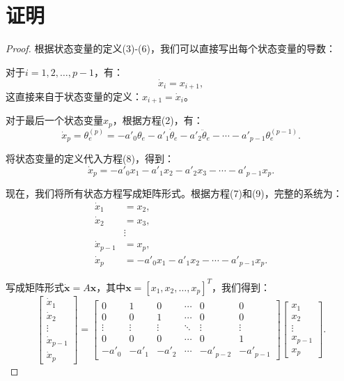 \documentclass[12pt,a4paper]{article}
\newtheorem{proof}{证明}
\begin{document}
\section{证明}

\begin{proof}
根据状态变量的定义(3)-(6)，我们可以直接写出每个状态变量的导数：

对于$i = 1, 2, \ldots, p-1$，有：
\begin{equation}
\dot{x}_i = x_{i+1},
\end{equation}
这直接来自于状态变量的定义：$x_{i+1} = \dot{x}_i$。

对于最后一个状态变量$x_p$，根据方程(2)，有：
\begin{equation}
\dot{x}_p = \theta_e^{(p)} = -a'_0 \theta_e - a'_1 \dot{\theta}_e - a'_2 \ddot{\theta}_e - \cdots - a'_{p-1} \theta_e^{(p-1)}.
\end{equation}

将状态变量的定义代入方程(8)，得到：
\begin{equation}
\dot{x}_p = -a'_0 x_1 - a'_1 x_2 - a'_2 x_3 - \cdots - a'_{p-1} x_p.
\end{equation}

现在，我们将所有状态方程写成矩阵形式。根据方程(7)和(9)，完整的系统为：
\begin{align}
\dot{x}_1 &= x_2, \\
\dot{x}_2 &= x_3, \\
&\vdots \\
\dot{x}_{p-1} &= x_p, \\
\dot{x}_p &= -a'_0 x_1 - a'_1 x_2 - \cdots - a'_{p-1} x_p.
\end{align}

写成矩阵形式$\dot{\mathbf{x}} = A\mathbf{x}$，其中$\mathbf{x} = [x_1, x_2, \ldots, x_p]^T$，我们得到：
\begin{equation}
\begin{bmatrix} \dot{x}_1 \\ \dot{x}_2 \\ \vdots \\ \dot{x}_{p-1} \\ \dot{x}_p \end{bmatrix} = \begin{bmatrix}
0 & 1 & 0 & \cdots & 0 & 0 \\
0 & 0 & 1 & \cdots & 0 & 0 \\
\vdots & \vdots & \vdots & \ddots & \vdots & \vdots \\
0 & 0 & 0 & \cdots & 0 & 1 \\
-a'_0 & -a'_1 & -a'_2 & \cdots & -a'_{p-2} & -a'_{p-1}
\end{bmatrix} \begin{bmatrix} x_1 \\ x_2 \\ \vdots \\ x_{p-1} \\ x_p \end{bmatrix}.
\end{equation}


\end{proof}
\end{document}
